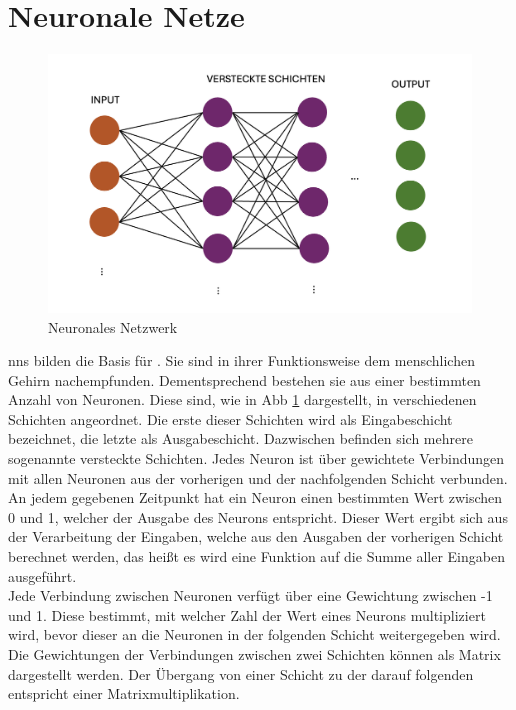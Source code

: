 \documentclass[../main.tex]{subfiles}
\begin{document}
\section{Neuronale Netze}

\begin{figure}[h!]
  \includegraphics[scale=0.6]{bilder/NeuralNetwork.png}
  \caption{Neuronales Netzwerk}
  \label{fig:NN}
\end{figure}
\glspl{nn} bilden die Basis für . Sie sind in ihrer Funktionsweise dem menschlichen Gehirn nachempfunden. Dementsprechend bestehen sie aus einer 
bestimmten Anzahl von Neuronen. Diese sind, wie in Abb \ref{fig:NN} dargestellt, in verschiedenen Schichten angeordnet. Die erste dieser Schichten wird als Eingabeschicht bezeichnet, die letzte als Ausgabeschicht. Dazwischen 
befinden sich mehrere sogenannte versteckte Schichten. Jedes Neuron ist über gewichtete Verbindungen mit allen Neuronen aus der vorherigen und der nachfolgenden Schicht verbunden. 
An jedem gegebenen Zeitpunkt hat ein Neuron einen bestimmten Wert zwischen 0 und 1, welcher der Ausgabe des Neurons entspricht. Dieser Wert ergibt sich aus der Verarbeitung der Eingaben, welche 
aus den Ausgaben der vorherigen Schicht berechnet werden, das heißt es wird eine Funktion auf die Summe aller Eingaben ausgeführt. \\
Jede Verbindung zwischen Neuronen verfügt über eine Gewichtung zwischen -1 und 1. Diese bestimmt, mit welcher Zahl der Wert eines Neurons multipliziert wird, bevor dieser an die Neuronen in 
der folgenden Schicht weitergegeben wird. Die Gewichtungen der Verbindungen zwischen zwei Schichten können als Matrix dargestellt werden. Der Übergang von einer 
Schicht zu der darauf folgenden entspricht einer Matrixmultiplikation. \\
\end{document}
